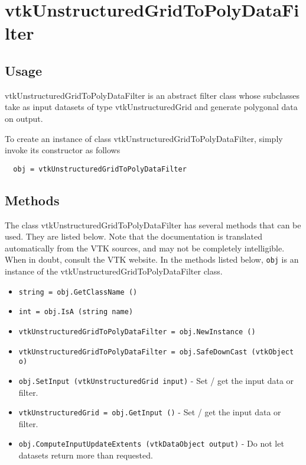 \section{vtkUnstructuredGridToPolyDataFilter}

\subsection{Usage}

 vtkUnstructuredGridToPolyDataFilter is an abstract filter class whose
 subclasses take as input datasets of type vtkUnstructuredGrid and 
 generate polygonal data on output.

To create an instance of class vtkUnstructuredGridToPolyDataFilter, simply
invoke its constructor as follows
\begin{verbatim}
  obj = vtkUnstructuredGridToPolyDataFilter
\end{verbatim}
\subsection{Methods}

The class vtkUnstructuredGridToPolyDataFilter has several methods that can be used.
  They are listed below.
Note that the documentation is translated automatically from the VTK sources,
and may not be completely intelligible.  When in doubt, consult the VTK website.
In the methods listed below, \verb|obj| is an instance of the vtkUnstructuredGridToPolyDataFilter class.
\begin{itemize}
\item  \verb|string = obj.GetClassName ()|

\item  \verb|int = obj.IsA (string name)|

\item  \verb|vtkUnstructuredGridToPolyDataFilter = obj.NewInstance ()|

\item  \verb|vtkUnstructuredGridToPolyDataFilter = obj.SafeDownCast (vtkObject o)|

\item  \verb|obj.SetInput (vtkUnstructuredGrid input)| -  Set / get the input data or filter.

\item  \verb|vtkUnstructuredGrid = obj.GetInput ()| -  Set / get the input data or filter.

\item  \verb|obj.ComputeInputUpdateExtents (vtkDataObject output)| -  Do not let datasets return more than requested.

\end{itemize}
